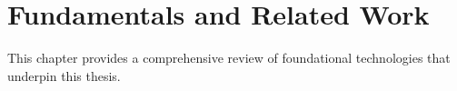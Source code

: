 \chapter{Fundamentals and Related Work}
\label{chap:fundamentals}

This chapter provides a comprehensive review of foundational technologies
that underpin this thesis.
% 





% 



